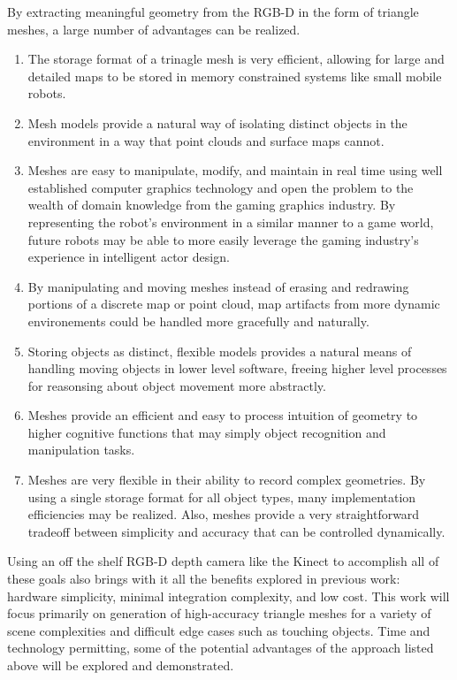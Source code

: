 \documentclass[english]{article}
\begin{document}
By extracting meaningful geometry from the RGB-D in the form of triangle meshes, a large number of advantages can be realized.
\begin{enumerate}
\item The storage format of a trinagle mesh is very efficient, allowing for large and detailed maps to be stored in memory constrained systems like small mobile robots. 
\item Mesh models provide a natural way of isolating distinct objects in the environment in a way that point clouds and surface maps cannot. 
\item Meshes are easy to manipulate, modify, and maintain in real time using well established computer graphics technology and open the problem to the wealth of domain knowledge from the gaming graphics industry. By representing the robot's environment in a similar manner to a game world, future robots may be able to more easily leverage the gaming industry's experience in intelligent actor design. 
\item By manipulating and moving meshes instead of erasing and redrawing portions of a discrete map or point cloud, map artifacts from more dynamic environements could be handled more gracefully and naturally.
\item Storing objects as distinct, flexible models provides a natural means of handling moving objects in lower level software, freeing higher level processes for reasonsing about object movement more abstractly.
\item Meshes provide an efficient and easy to process intuition of geometry to higher cognitive functions that may simply object recognition and manipulation tasks.
\item Meshes are very flexible in their ability to record complex geometries. By using a single storage format for all object types, many implementation efficiencies may be realized. Also, meshes provide a very straightforward tradeoff between simplicity and accuracy that can be controlled dynamically.
\end{enumerate}
Using an off the shelf RGB-D depth camera like the Kinect to accomplish all of these goals also brings with it all the benefits explored in previous work: hardware simplicity, minimal integration complexity, and low cost. This work will focus primarily on generation of high-accuracy triangle meshes for a variety of scene complexities and difficult edge cases such as touching objects. Time and technology permitting, some of the potential advantages of the approach listed above will be explored and demonstrated.
\end{document}
